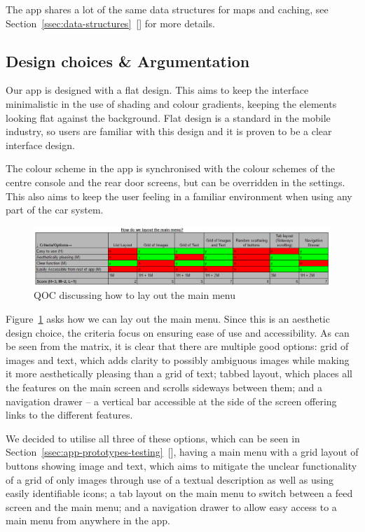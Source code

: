 \documentclass{article}
\begin{document}
The app shares a lot of the same data structures for maps and caching, see Section~\ref{ssec:data-structures}~[] for more details.

\subsection{Design choices \& Argumentation}\label{ssec:app-design}

Our app is designed with a flat design. This aims to keep the interface minimalistic in the use of shading and colour gradients, keeping the elements looking flat against the background. Flat design is a standard in the mobile industry, so users are familiar with this design and it is proven to be a clear interface design.

The colour scheme in the app is synchronised with the colour schemes of the centre console and the rear door screens, but can be overridden in the settings. This also aims to keep the user feeling in a familiar environment when using any part of the car system.

\begin{figure}[H]
  \centering
  \includegraphics[width=\textwidth]{qoc-app-menu}
  \caption{QOC discussing how to lay out the main menu}\label{qoc-app-menu}
\end{figure}
Figure~\ref{qoc-app-menu} asks how we can lay out the main menu. Since this is an aesthetic design choice, the criteria focus on ensuring ease of use and accessibility. As can be seen from the matrix, it is clear that there are multiple good options: grid of images and text, which adds clarity to possibly ambiguous images while making it more aesthetically pleasing than a grid of text; tabbed layout, which places all the features on the main screen and scrolls sideways between them; and a navigation drawer -- a vertical bar accessible at the side of the screen offering links to the different features.

We decided to utilise all three of these options, which can be seen in Section~\ref{ssec:app-prototypes-testing}~[], having a main menu with a grid layout of buttons showing image and text, which aims to mitigate the unclear functionality of a grid of only images through use of a textual description as well as using easily identifiable icons; a tab layout on the main menu to switch between a feed screen and the main menu; and a navigation drawer to allow easy access to a main menu from anywhere in the app.
\end{document}
